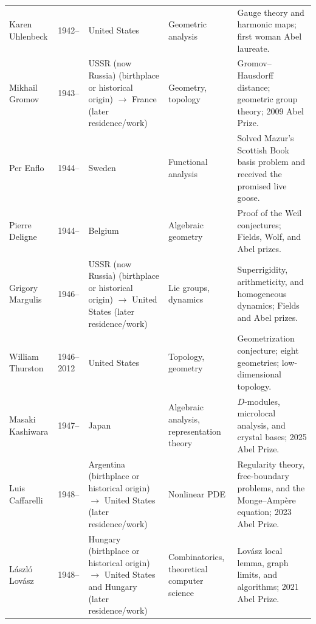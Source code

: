 {\begin{longtable}{@{}L{0.145\textwidth}L{0.09\textwidth}L{0.225\textwidth}L{0.14\textwidth}L{0.30\textwidth}@{}}
        Karen Uhlenbeck
        & 1942--
        & United States
        & Geometric analysis
        & Gauge theory and harmonic maps; first woman Abel laureate. \\

        Mikhail Gromov
        & 1943--
        & USSR (now Russia) (birthplace or historical origin) \(\to\) France (later residence/work)
        & Geometry, topology
        & Gromov--Hausdorff distance; geometric group theory; 2009 Abel Prize. \\

        Per Enflo
        & 1944--
        & Sweden
        & Functional analysis
        & Solved Mazur's Scottish Book basis problem and received the promised
          live goose. \\

        Pierre Deligne
        & 1944--
        & Belgium
        & Algebraic geometry
        & Proof of the Weil conjectures; Fields, Wolf, and Abel prizes. \\

        Grigory Margulis
        & 1946--
        & USSR (now Russia) (birthplace or historical origin) \(\to\) United States (later residence/work)
        & Lie groups, dynamics
        & Superrigidity, arithmeticity, and homogeneous dynamics; Fields and
          Abel prizes. \\

        William Thurston
        & 1946--2012
        & United States
        & Topology, geometry
        & Geometrization conjecture; eight geometries; low-dimensional
          topology. \\

        Masaki Kashiwara
        & 1947--
        & Japan
        & Algebraic analysis, representation theory
        & $D$-modules, microlocal analysis, and crystal bases; 2025 Abel Prize. \\

        Luis Caffarelli
        & 1948--
        & Argentina (birthplace or historical origin) \(\to\) United States (later residence/work)
        & Nonlinear PDE
        & Regularity theory, free-boundary problems, and the Monge--Ampère
          equation; 2023 Abel Prize. \\

        László Lovász
        & 1948--
        & Hungary (birthplace or historical origin) \(\to\) United States and Hungary (later residence/work)
        & Combinatorics, theoretical computer science
        & Lovász local lemma, graph limits, and algorithms; 2021 Abel Prize. \\


\end{longtable}}
